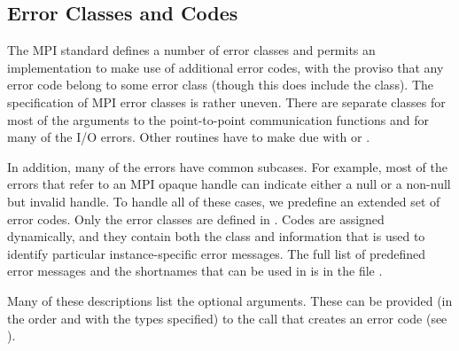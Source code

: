 %
\subsection{Error Classes and Codes}
The MPI standard defines a number of error classes and permits an
implementation to make use of additional error codes, with the proviso that
any error code belong to some error class (though this does include the
 class).  
The specification of MPI error classes is rather uneven.  There are separate
classes for most of the arguments to the point-to-point communication
functions and for many of the I/O errors.  Other routines have to make due
with  or .

In addition, many of the errors have common subcases.  For example, most of
the errors that refer to an MPI opaque handle can indicate either a null or a
non-null but invalid handle.   To handle all of these cases, we predefine an
extended set of error codes.  Only the error classes are defined in
.
Codes are assigned dynamically, and they contain both the class and
information that is used to identify particular instance-specific
error messages.  The full list of predefined error messages and the
shortnames that can be used in  is in
the file .



Many of these descriptions list the optional arguments.  These can be provided
(in the order and with the types specified) to the call that creates an error
code (see ). 


